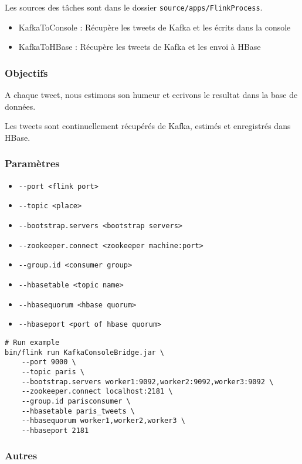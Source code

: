 \documentclass[a4paper,oneside,12pt]{article}
\begin{document}
Les sources des tâches sont dans le dossier \verb!source/apps/FlinkProcess!. 

\begin{itemize}
\item KafkaToConsole : Récupère les tweets de Kafka et les écrits dans la console
\item KafkaToHBase : Récupère les tweets de Kafka et les envoi à HBase
\end{itemize}

\subsubsection{Objectifs}

A chaque tweet, nous estimons son humeur et ecrivons le resultat dans la base de données. 

Les tweets sont continuellement récupérés de Kafka, estimés et enregistrés dans HBase. 

\subsubsection{Paramètres}

\begin{itemize}
\item \verb!--port <flink port>! 
\item \verb!--topic <place>!
\item \verb!--bootstrap.servers <bootstrap servers>!
\item \verb!--zookeeper.connect <zookeeper machine:port>!
\item \verb!--group.id <consumer group>!
\item \verb!--hbasetable <topic name>!
\item \verb!--hbasequorum <hbase quorum>!
\item \verb!--hbaseport <port of hbase quorum>!
\end{itemize}

\begin{verbatim}
# Run example
bin/flink run KafkaConsoleBridge.jar \
	--port 9000 \
	--topic paris \
	--bootstrap.servers worker1:9092,worker2:9092,worker3:9092 \
	--zookeeper.connect localhost:2181 \
	--group.id parisconsumer \
	--hbasetable paris_tweets \
	--hbasequorum worker1,worker2,worker3 \
	--hbaseport 2181
\end{verbatim}

\subsubsection{Autres}
\end{document}
